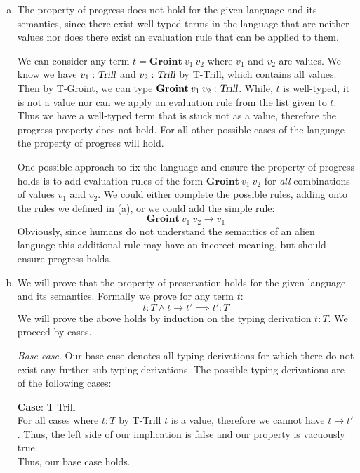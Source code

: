 \documentclass[12pt, fleqn]{article}
\begin{document}
\begin{enumerate}[(a)]
    \item The property of progress does not hold for the given language and its semantics, since there exist well-typed terms in the language that are neither values nor does there exist an evaluation rule that can be applied to them.
    
    We can consider any term $t = \textbf{Groint}\:v_1\:v_2$ where $v_1$ and $v_2$ are values. We know we have $v_1 : \textsl{Trill}$ and $v_2 : \textsl{Trill}$ by T-Trill, which contains all values. Then by T-Groint, we can type $\textbf{Groint}\:v_1\:v_2 : \textsl{Trill}$. While, $t$ is well-typed, it is not a value nor can we apply an evaluation rule from the list given to $t$. Thus we have a well-typed term that is stuck not as a value, therefore the progress property does not hold. For all other possible cases of the language the property of progress will hold.

    One possible approach to fix the language and ensure the property of progress holds is to add evaluation rules of the form $\textbf{Groint}\:v_1\:v_2$ for \emph{all} combinations of values $v_1$ and $v_2$. We could either complete the possible rules, adding onto the rules we defined in (a), or we could add the simple rule:
    \begin{equation}
        \textbf{Groint}\:v_1\:v_2 \rightarrow v_1 \tag{E-GrointV}
    \end{equation}
    Obviously, since humans do not understand the semantics of an alien language this additional rule may have an incorect meaning, but should ensure progress holds.

    \item We will prove that the property of preservation holds for the given language and its semantics. Formally we prove for any term $t$:
    $$t : T \land t \rightarrow t' \implies t' : T$$
    We will prove the above holds by induction on the typing derivation $t : T$. We proceed by cases.
    
    \emph{Base case}. Our base case denotes all typing derivations for which there do not exist any further sub-typing derivations. The possible typing derivations are of the following cases:
    
    \textbf{Case}: T-Trill\\
    For all cases where $t:T$ by T-Trill $t$ is a value, therefore we cannot have $t \rightarrow t'$. Thus, the left side of our implication is false and our property is vacuously true.\\
    Thus, our base case holds.


\end{enumerate}
\end{document}

